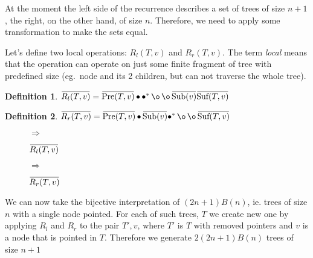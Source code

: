 \documentclass[final]{article}
\theoremstyle{definition}
\newtheorem{definition}{Definition}[subsection]
\theoremstyle{remark}
\newcommand{\ols}[1]{\mskip.5\thinmuskip\overline{\mskip-.5\thinmuskip {#1} \mskip-.5\thinmuskip}\mskip.5\thinmuskip} %
\newcommand{\enc}[1]{\ensuremath{\ols{#1}}}
\newcommand{\pointed}[1]{\ensuremath{{#1}^*}}
\DeclareMathOperator{\tSub}{\text{Sub}}
\DeclareMathOperator{\tPre}{\text{Pre}}
\DeclareMathOperator{\tSuf}{\text{Suf}}
\DeclareMathOperator{\n}{\bullet}
\DeclareMathOperator{\no}{\o}
\begin{document}
At the moment the left side of the recurrence describes a set of trees of size \(n + 1\), the right, on the other hand, of size \(n\). Therefore, we need to apply some transformation to make the sets equal.

Let's define two local operations: \(R_l(T, v)\) and \(R_r(T, v)\). The term \textit{local} means that the operation can operate on just some finite fragment of tree with predefined size (eg.\ node and its 2 children, but can not traverse the whole tree).

\begin{definition}
    \(\enc{R_l(T, v)} = \enc{\tPre(T, v)} \n \pointed{\n} \no \no \enc{\tSub(v)} \enc{\tSuf(T, v)}\)
\end{definition}

\begin{definition}
    \(\enc{R_r(T, v)} = \enc{\tPre(T, v)} \n \enc{\tSub(v)} \pointed{\n} \no \no \enc{\tSuf(T, v)} \)
\end{definition}

\begin{figure}[h]
    \centering
    \begin{minipage}{.25\textwidth}\end{minipage}%
    \(\Rightarrow\)
    \begin{minipage}{.4\textwidth}\end{minipage}%
    \caption{\(\enc{R_l(T, v)}\)}
    \label{fig:remy_left}
\end{figure}

\begin{figure}[h]
    \centering
    \begin{minipage}{.25\textwidth}\end{minipage}%
    \(\Rightarrow\)
    \begin{minipage}{.4\textwidth}\end{minipage}%
    \caption{\(\enc{R_r(T, v)}\)}
    \label{fig:remy_right}
\end{figure}

We can now take the bijective interpretation of \((2n + 1) B(n)\), ie. trees of size \(n\) with a single node pointed. For each of such trees, \(T\) we create new one by applying \(R_l\) and \(R_r\) to the pair \(T', v\), where \(T'\) is \(T\) with removed pointers and \(v\) is a node that is pointed in \(T\). Therefore we generate \(2(2n + 1) B(n)\) trees of size \(n + 1\)
\end{document}
